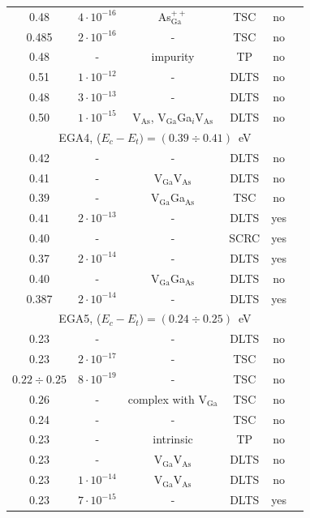 \documentclass[final,3p,times,twocolumn,authoryear]{elsarticle}
\begin{document}
\begin{table}
\begin{minipage}{1.85\textwidth}
\begin{tabular}{cccccc}
0.48&$4\cdot10^{-16}$&As$_\mathrm{Ga}^{++}$&TSC&no&\cite{Pavlovic2000}\\ %
0.485&$2\cdot10^{-16}$&-&TSC&no&\cite{Pavlovic:GaAs}\\ %
0.48&-&impurity&TP&no&\cite{Abele:GaAs}\\ %
0.51&$1\cdot10^{-12}$&-&DLTS&no&\cite{Martin1977}\\ %
0.48&$3\cdot10^{-13}$&-&DLTS&no&\cite{Lang:GaAs}\\ %
0.50&$1\cdot10^{-15}$&V$_\mathrm{As}$, V$_\mathrm{Ga}$Ga$_i$V$_\mathrm{As}$ &DLTS&no&\cite{Pons}\\
\multicolumn{6}{c}{EGA4, ($E_c-E_t)=(0.39\div0.41)$~eV}\\
0.42&-&-&DLTS&no&\cite{Neild1991}\\ %
0.41&-&V$_\mathrm{Ga}$V$_\mathrm{As}$&DLTS&no&\cite{Samoilov1994En}\\ %
$0.39$&-&V$_\mathrm{Ga}$Ga$_\mathrm{As}$&TSC&no&\cite{FANG1990}\\ %
$0.41$&$2\cdot10^{-13}$&-&DLTS&yes&\cite{Bourgoin:GaAs}\\ %
0.40&-&-&SCRC&yes&\cite{ASHBY:GaAs}\\ %
0.37&$2\cdot10^{-14}$&-&DLTS&yes&\cite{Fang:EL6}\\ %
0.40&-&V$_\mathrm{Ga}$Ga$_\mathrm{As}$&DLTS&no&\cite{VaitkusEn}\\ %
0.387&$2\cdot10^{-14}$&-&DLTS&yes&\cite{Yousefi1995}\\ %
\multicolumn{6}{c}{EGA5, ($E_c-E_t)=(0.24\div0.25)$~eV}\\
0.23&-&-&DLTS&no&\cite{Neild1991}\\ %
0.23&$2\cdot10^{-17}$&-&TSC&no&\cite{Pavlovic2000}\\ %
$0.22\div0.25$&$8\cdot10^{-19}$&-&TSC&no&\cite{Lin:GaAs}\\ %
$0.26$&-&complex with V$_\mathrm{Ga}$&TSC&no&\cite{FANG1990}\\ %
0.24&-&-&TSC&no&\cite{Tomozane:GaAs}\\ %
0.23&-&intrinsic&TP&no&\cite{Abele:GaAs}\\ %
0.23&-&V$_\mathrm{Ga}$V$_\mathrm{As}$&DLTS&no&\cite{Morrow:EL17}\\ %
0.23&$1\cdot10^{-14}$&V$_\mathrm{Ga}$V$_\mathrm{As}$&DLTS&no&\cite{Bourgoin:GaAs}\\ %
0.23&$7\cdot10^{-15}$&-&DLTS&yes&\cite{Mircea1975}\\ %

\end{tabular}
\end{minipage}
\end{table}
\end{document}
